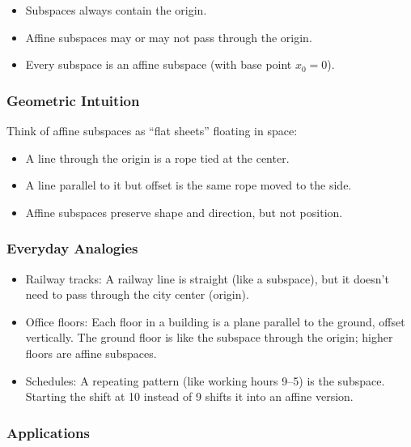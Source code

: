 \documentclass[
  letterpaper,
  DIV=11,
  numbers=noendperiod]{scrreprt}
\providecommand{\tightlist}{%
  \setlength{\itemsep}{0pt}\setlength{\parskip}{0pt}}
\begin{document}
\begin{itemize}
\tightlist
\item
  Subspaces always contain the origin.
\item
  Affine subspaces may or may not pass through the origin.
\item
  Every subspace is an affine subspace (with base point \(x_0 = 0\)).
\end{itemize}

\subsubsection{Geometric Intuition}\label{geometric-intuition-2}

Think of affine subspaces as ``flat sheets'' floating in space:

\begin{itemize}
\tightlist
\item
  A line through the origin is a rope tied at the center.
\item
  A line parallel to it but offset is the same rope moved to the side.
\item
  Affine subspaces preserve shape and direction, but not position.
\end{itemize}

\subsubsection{Everyday Analogies}\label{everyday-analogies-36}

\begin{itemize}
\tightlist
\item
  Railway tracks: A railway line is straight (like a subspace), but it
  doesn't need to pass through the city center (origin).
\item
  Office floors: Each floor in a building is a plane parallel to the
  ground, offset vertically. The ground floor is like the subspace
  through the origin; higher floors are affine subspaces.
\item
  Schedules: A repeating pattern (like working hours 9--5) is the
  subspace. Starting the shift at 10 instead of 9 shifts it into an
  affine version.
\end{itemize}

\subsubsection{Applications}\label{applications-3}
\end{document}

